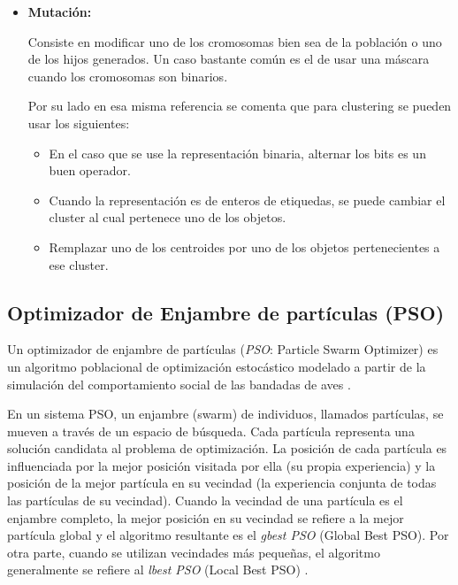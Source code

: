 \begin{itemize}
\begin{itemize}
[1 3 3 6 6] y [5 1 2 6 2]

De esta misma forma se puede extender para m\'as puntos.

\end{itemize}

\item {\bf Mutaci\'on:}

Consiste en modificar uno de los cromosomas bien sea de la poblaci\'on
o uno de los hijos generados. Un caso bastante com\'un es el de usar una m\'ascara
cuando los cromosomas son binarios\cite{GePo2010}.

Por su lado en esa misma referencia se comenta que para clustering se pueden usar los siguientes:

\begin{itemize}

\item En el caso que se use la representaci\'on binaria, alternar los bits es un
buen operador.

\item Cuando la representaci\'on es de enteros de etiquedas, se puede cambiar
el cluster al cual pertenece uno de los objetos.

\item Remplazar uno de los centroides por uno de los objetos pertenecientes a ese
cluster.

\end{itemize}

\end{itemize}

\subsection{Optimizador de Enjambre de partículas (PSO)}

    Un optimizador de enjambre de partículas (\emph{PSO}: Particle Swarm Optimizer)
es un algoritmo poblacional de optimización estocástico modelado a partir de la
simulación del comportamiento social de las bandadas de aves \cite{PSO_1}
\cite{PSO_2}.

    En un sistema PSO, un enjambre (swarm) de individuos, llamados partículas, se
mueven a través de un espacio de búsqueda. Cada partícula representa una
solución candidata al problema de optimización. La posición de  cada partícula
es influenciada por la mejor posición visitada por ella (su propia experiencia)
y la posición de la mejor partícula en su vecindad (la experiencia conjunta de
todas las partículas de su vecindad). Cuando la vecindad de una partícula es
el enjambre completo, la mejor posición en su vecindad se refiere a la mejor
partícula global y el algoritmo resultante es el \emph{gbest PSO} (Global Best
PSO). Por otra parte, cuando se utilizan vecindades más pequeñas, el algoritmo
generalmente se refiere al \emph{lbest PSO} (Local Best PSO) \cite{PSO_0}.

